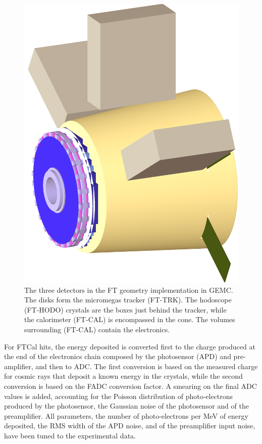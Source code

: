 \begin{figure}[h]
	\centering
	\includegraphics[width=0.99\columnwidth,keepaspectratio]{img/ftGeometry.png}
	\caption{The three detectors in the FT geometry implementation in GEMC.
             The disks form the micromegas tracker (FT-TRK). The hodoscope (FT-HODO) crystals are the boxes just behind the tracker,
			 while the calorimeter (FT-CAL) is encompassed in the cone. The volumes surrounding (FT-CAL) contain the electronics.}
	\label{fig:ftGeometry}
\end{figure}

For FTCal hits, the energy deposited is converted first to the charge produced at the end of the electronics chain composed
by the photosensor (APD) and pre-amplifier, and then to ADC.
The first conversion is based on the measured charge for cosmic rays that deposit a known energy in the crystals,
while the second conversion is based on the FADC conversion factor. A smearing on the final ADC values is added,
accounting for the Poisson distribution of photo-electrons produced by the photosensor, the Gaussian noise of the
photosensor and of the preamplifier. All parameters, the number of photo-electrons per MeV of energy deposited,
the RMS width of the APD noise, and of the preamplifier input noise, have been tuned to the experimental data.

